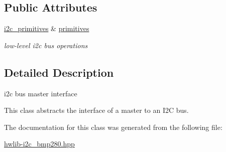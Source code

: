\subsection*{Public Attributes}
\begin{DoxyCompactItemize}
\item 
\mbox{\label{classhwlib_1_1i2c__bus_a676f1d61bce4122a7d446a42f749d567}} 
\mbox{\hyperlink{classhwlib_1_1i2c__primitives}{i2c\+\_\+primitives}} \& \mbox{\hyperlink{classhwlib_1_1i2c__bus_a676f1d61bce4122a7d446a42f749d567}{primitives}}
\begin{DoxyCompactList}\small\item\em low-\/level i2c bus operations \end{DoxyCompactList}\end{DoxyCompactItemize}


\subsection{Detailed Description}
i2c bus master interface

This class abstracts the interface of a master to an I2C bus. 

The documentation for this class was generated from the following file\+:\begin{DoxyCompactItemize}
\item 
\mbox{\hyperlink{hwlib-i2c__bmp280_8hpp}{hwlib-\/i2c\+\_\+bmp280.\+hpp}}\end{DoxyCompactItemize}
